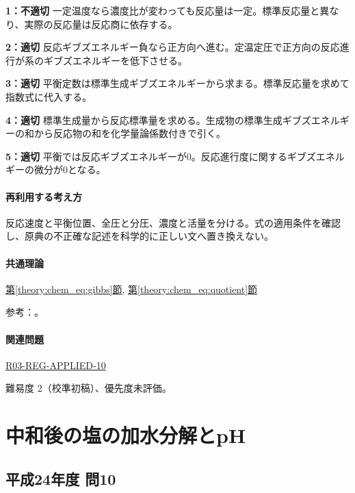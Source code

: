 \noindent\textbf{1：不適切} 一定温度なら濃度比が変わっても反応量は一定。標準反応量と異なり、実際の反応量は反応商に依存する。\par

\noindent\textbf{2：適切} 反応ギブズエネルギー負なら正方向へ進む。定温定圧で正方向の反応進行が系のギブズエネルギーを低下させる。\par

\noindent\textbf{3：適切} 平衡定数は標準生成ギブズエネルギーから求まる。標準反応量を求めて指数式に代入する。\par

\noindent\textbf{4：適切} 標準生成量から反応標準量を求める。生成物の標準生成ギブズエネルギーの和から反応物の和を化学量論係数付きで引く。\par

\noindent\textbf{5：適切} 平衡では反応ギブズエネルギーが0。反応進行度に関するギブズエネルギーの微分が0となる。\par

\paragraph{再利用する考え方} 反応速度と平衡位置、全圧と分圧、濃度と活量を分ける。式の適用条件を確認し、原典の不正確な記述を科学的に正しい文へ置き換えない。

\paragraph{共通理論} \hyperref[theory:chem_eq:gibbs]{第\ref*{theory:chem_eq:gibbs}節}, \hyperref[theory:chem_eq:quotient]{第\ref*{theory:chem_eq:quotient}節}

\par 参考：\cite{iupac_greenbook2012}。

\paragraph{関連問題} \hyperref[q:r03-reg-applied-10]{R03-REG-APPLIED-10}

\par 難易度 2（校準初稿）、優先度未評価。

\section{中和後の塩の加水分解とpH}

\subsection{平成24年度 問10}
\label{q:h24-reg-applied-10}

